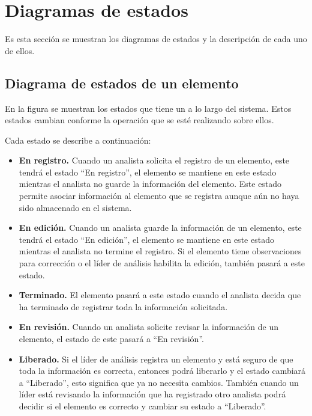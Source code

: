 \section{Diagramas de estados}
Es esta sección se muestran los diagramas de estados y la descripción de cada uno de ellos.\\

\subsection{Diagrama de estados de un elemento}

En la figura  se muestran los estados que tiene un  a lo largo 
del sistema. Estos estados cambian conforme la operación que se esté realizando sobre ellos.\\


Cada estado se describe a continuación:

\begin{itemize}
 \item {\bf En registro.} Cuando un analista solicita el registro de un elemento, este tendrá el estado ``En registro'', el elemento se mantiene en 
 este estado mientras el analista no guarde la información del elemento. Este estado permite asociar información al elemento que se registra aunque aún no 
 haya sido almacenado en el sistema.
 \item {\bf En edición.} Cuando un analista guarde la información de un elemento, este tendrá el estado ``En edición'', el elemento se mantiene en 
 este estado mientras el analista no termine el registro. Si el elemento tiene observaciones para corrección o el líder de análisis habilita la edición,
 también pasará a este estado.
 \item {\bf Terminado.} El elemento pasará a este estado cuando el analista decida que ha terminado de registrar toda la información solicitada.
 \item {\bf En revisión.} Cuando un analista solicite revisar la información de un elemento, el estado de este pasará a ``En revisión''.
 \item {\bf Liberado.} Si el líder de análisis registra un elemento y está seguro de que toda la información es correcta, entonces podrá liberarlo y el estado cambiará
 a ``Liberado'', esto significa que ya no necesita cambios. También cuando un líder está revisando la información que ha registrado otro analista
 podrá decidir si el elemento es correcto y cambiar su estado a ``Liberado''.
\end{itemize}

